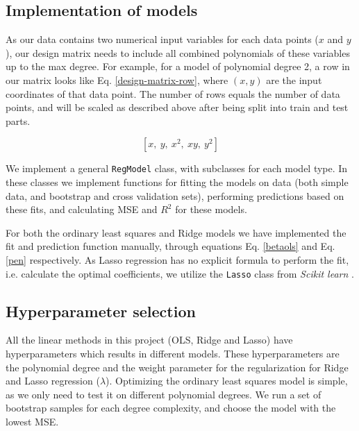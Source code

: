\subsection{Implementation of models}

As our data contains two numerical input variables for each data points ($x$ and $y$), our design matrix needs to include all combined polynomials of these variables up to the max degree. 
For example, for a model of polynomial degree 2, a row in our matrix looks like Eq. \ref{design-matrix-row}, where $(x,y)$ are the input coordinates of that data point.
The number of rows equals the number of data points, and will be scaled as described above after being split into train and test parts.

\begin{equation}\label{design-matrix-row}
    \left[x,\ y,\ x^2,\ xy,\ y^2\right]
\end{equation}

We implement a general \texttt{RegModel} class, with subclasses for each model type.
In these classes we implement functions for fitting the models on data (both simple data, and bootstrap and cross validation sets), performing predictions based on these fits, and calculating MSE and $R^2$ for these models.

For both the ordinary least squares and Ridge models we have implemented the fit and prediction function manually, through equations Eq. \ref{betaols} and Eq. \ref{pen} respectively.
As Lasso regression has no explicit formula to perform the fit, i.e. calculate the optimal coefficients, we utilize the \texttt{Lasso} class from \textit{Scikit learn} \cite{sklearn}.

\subsection{Hyperparameter selection}
All the linear methods in this project (OLS, Ridge and Lasso) have hyperparameters which results in different models. 
These hyperparameters are the polynomial degree and the weight parameter for the regularization for Ridge and Lasso regression ($\lambda$). 
Optimizing the ordinary least squares model is simple, as we only need to test it on different polynomial degrees.
We run a set of bootstrap samples for each degree complexity, and choose the model with the lowest MSE.

